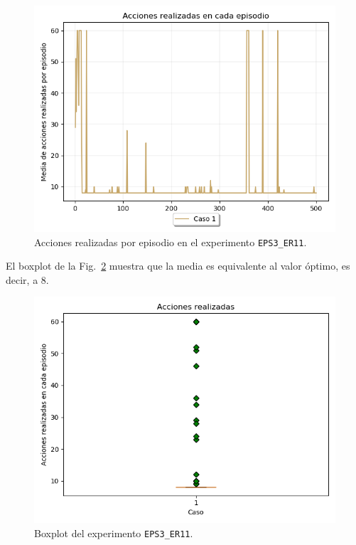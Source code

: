 \begin{figure}
    \centering
    \includegraphics[scale=0.4]{cap5_experimentacion/images/dim5_lr0.01_ep1_acciones.png}
    \caption{Acciones realizadas por episodio en el experimento \texttt{EPS3\_ER11}.}
    \label{fig:dim5_lr0.01_ep1_acciones}
\end{figure}

El boxplot de la Fig.~\ref{fig:dim5_lr0.01_ep1_boxplot} muestra que la media es equivalente al valor óptimo, es decir, a 8. \\

\begin{figure}
    \centering
    \includegraphics[scale=0.4]{cap5_experimentacion/images/dim5_lr0.01_ep1_boxplot.png}
    \caption{Boxplot del experimento \texttt{EPS3\_ER11}.}
    \label{fig:dim5_lr0.01_ep1_boxplot}
\end{figure}

